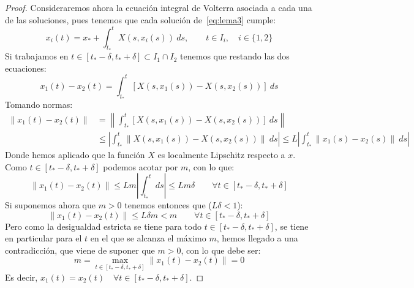\begin{lema}
\begin{proof}
        \noindent
        Consideraremos ahora la ecuación integral de Volterra asociada a cada una de las soluciones, pues tenemos que cada solución de~\eqref{eq:lema3} cumple:
        \begin{equation*}
            x_i(t) = x_\ast + \int_{t_\ast}^{t} X(s,x_i(s))~ds , \qquad t\in I_i, \quad i \in \{1,2\}
        \end{equation*}
        Si trabajamos en $t\in [t_\ast - \delta, t_\ast + \delta]\subset I_1\cap I_2$ tenemos que restando las dos ecuaciones:
        \begin{equation*}
            x_1(t) - x_2(t) = \int_{t_\ast}^{t} [X(s,x_1(s)) - X(s,x_2(s))]~ds 
        \end{equation*}
        Tomando normas:
        \begin{align*}
            \|x_1(t) - x_2(t)\| &= \left\|\int_{t_\ast}^{t} [X(s,x_1(s)) - X(s,x_2(s))]~ds \right\| \\ 
                                &\leq \left|\int_{t_\ast}^{t} \|X(s,x_1(s)) - X(s,x_2(s))\|~ds\right| \leq L\left|\int_{t_\ast}^{t} \|x_1(s) - x_2(s)\|~ds \right|
        \end{align*}
        Donde hemos aplicado que la función $X$ es localmente Lipschitz respecto a $x$. Como $t\in [t_\ast-\delta,t_\ast+\delta]$ podemos acotar por $m$, con lo que:
        \begin{equation*}
            \|x_1(t) - x_2(t)\| \leq Lm\left|\int_{t_\ast}^{t}ds \right| \leq Lm\delta  \qquad \forall t\in [t_\ast-\delta,t_\ast+\delta]
        \end{equation*}
        Si suponemos ahora que $m>0$ tenemos entonces que ($L\delta < 1$):
        \begin{equation*}
            \|x_1(t) - x_2(t)\| \leq L\delta m < m \qquad \forall t\in [t_\ast-\delta,t_\ast+\delta]
        \end{equation*}
        Pero como la desigualdad estricta se tiene para todo $t\in [t_\ast-\delta,t_\ast+\delta]$, se tiene en particular para el $t$ en el que se alcanza el máximo $m$, hemos llegado a una contradicción, que viene de suponer que $m>0$, con lo que debe ser:
        \begin{equation*}
            m = \max_{t\in [t_\ast-\delta,t_\ast+\delta]}\|x_1(t) - x_2(t)\| = 0
        \end{equation*}
        Es decir, $x_1(t) = x_2(t)\quad \forall t\in [t_\ast-\delta,t_\ast+\delta]$.
    \end{proof}
\end{lema}

